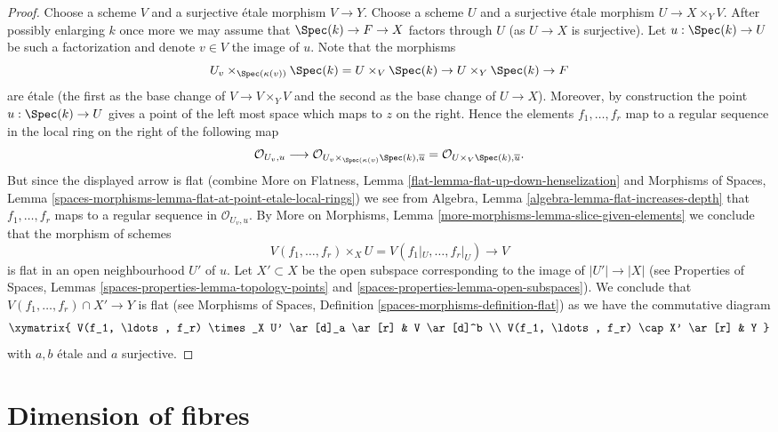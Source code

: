 \begin{proof}
\medskip\noindent
Choose a scheme $V$ and a surjective \'etale morphism
$V \to Y$. Choose a scheme $U$ and a surjective \'etale morphism
$U \to X \times_Y V$. After possibly enlarging $k$ once more we may
assume that $\Spec(k) \to F \to X$ factors through $U$ (as
$U \to X$ is surjective). Let
$u : \Spec(k) \to U$ be such a factorization and denote $v \in V$
the image of $u$. Note that the morphisms
$$
U_v \times_{\Spec(\kappa(v))} \Spec(k) =
U \times_V \Spec(k) \to U \times_Y \Spec(k) \to F
$$
are \'etale (the first as the base change of $V \to V \times_Y V$ and
the second as the base change of $U \to X$). Moreover, by construction
the point $u : \Spec(k) \to U$ gives a point of the left most
space which maps to $z$ on the right. Hence the elements
$f_1, \ldots, f_r$ map to a regular sequence in the local ring
on the right of the following map
$$
\mathcal{O}_{U_v, u}
\longrightarrow
\mathcal{O}_{U_v \times_{\Spec(\kappa(v)} \Spec(k), \overline{u}}
=
\mathcal{O}_{U \times_V \Spec(k), \overline{u}}.
$$
But since the displayed arrow is flat (combine
More on Flatness, Lemma \ref{flat-lemma-flat-up-down-henselization}
and
Morphisms of Spaces,
Lemma \ref{spaces-morphisms-lemma-flat-at-point-etale-local-rings})
we see from
Algebra, Lemma \ref{algebra-lemma-flat-increases-depth}
that $f_1, \ldots, f_r$ maps to a regular sequence in
$\mathcal{O}_{U_v, u}$. By
More on Morphisms, Lemma \ref{more-morphisms-lemma-slice-given-elements}
we conclude that the morphism of schemes
$$
V(f_1, \ldots, f_r) \times_X U = V(f_1|_U, \ldots, f_r|_U) \to V
$$
is flat in an open neighbourhood $U'$ of $u$. Let $X' \subset X$
be the open subspace corresponding to the image of
$|U'| \to |X|$ (see
Properties of Spaces, Lemmas
\ref{spaces-properties-lemma-topology-points} and
\ref{spaces-properties-lemma-open-subspaces}).
We conclude that $V(f_1, \ldots, f_r) \cap X' \to Y$ is flat
(see
Morphisms of Spaces, Definition \ref{spaces-morphisms-definition-flat})
as
we have the commutative diagram
$$
\xymatrix{
V(f_1, \ldots, f_r) \times_X U' \ar[d]_a \ar[r] & V \ar[d]^b \\
V(f_1, \ldots, f_r) \cap X' \ar[r] & Y
}
$$
with $a, b$ \'etale and $a$ surjective.
\end{proof}







\section{Dimension of fibres}
\label{section-dimension}

